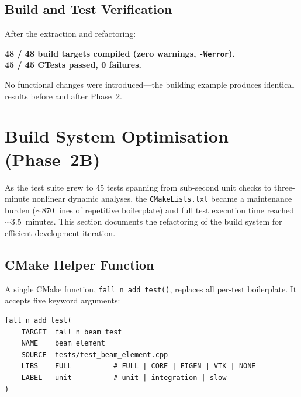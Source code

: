 \subsection{Build and Test Verification}
\label{sec:phase2-verification}

After the extraction and refactoring:

\begin{center}
  \textbf{48 / 48 build targets compiled (zero warnings, \texttt{-Werror}).}\\[4pt]
  \textbf{45 / 45 CTests passed, 0 failures.}
\end{center}

No functional changes were introduced---the building example produces
identical results before and after Phase~2.


\section{Build System Optimisation (Phase~2B)}
\label{sec:build-optimisation}

As the test suite grew to 45 tests spanning from sub-second unit
checks to three-minute nonlinear dynamic analyses, the
\texttt{CMakeLists.txt} became a maintenance burden ($\sim$870 lines
of repetitive boilerplate) and full test execution time reached
$\sim$3.5~minutes.  This section documents the refactoring of the
build system for efficient development iteration.

\subsection{CMake Helper Function}
\label{sec:cmake-helper}

A single CMake function, \texttt{fall\_n\_add\_test()}, replaces all
per-test boilerplate.  It accepts five keyword arguments:

\begin{lstlisting}[language={},basicstyle=\small\ttfamily,
  morekeywords={fall_n_add_test,TARGET,NAME,SOURCE,LIBS,LABEL}]
fall_n_add_test(
    TARGET  fall_n_beam_test
    NAME    beam_element
    SOURCE  tests/test_beam_element.cpp
    LIBS    FULL          # FULL | CORE | EIGEN | VTK | NONE
    LABEL   unit          # unit | integration | slow
)
\end{lstlisting}

